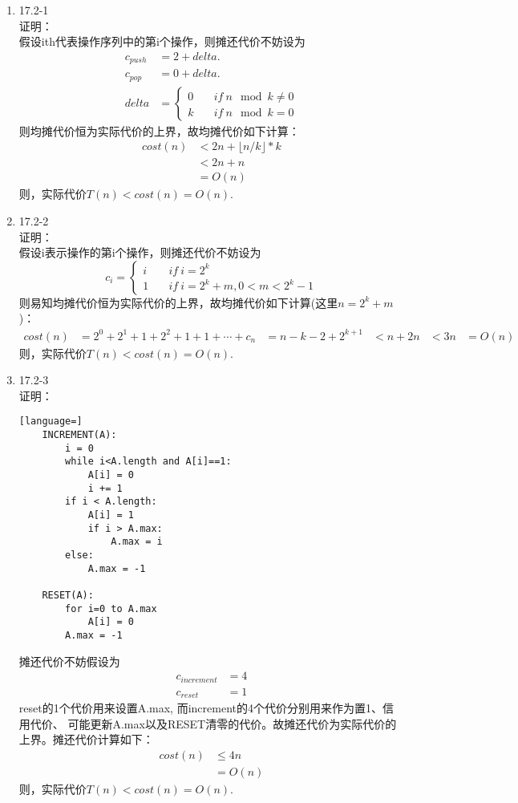 \documentclass[UTF8]{ctexart}
\begin{document}
\begin{enumerate}
	\item 17.2-1 \\
	证明：\\
	假设ith代表操作序列中的第i个操作，则摊还代价不妨设为
	\[
		\begin{aligned}
		c_{push} &= 2 + delta.	\\
		c_{pop} &= 0 + delta.	\\
		delta &= \left\{
		\begin{aligned}
			0 &\quad if\ n\mod k\neq0	\\
			k &\quad if\ n\mod k=0
		\end{aligned}
		\right.
		\end{aligned}
	\]
	则均摊代价恒为实际代价的上界，故均摊代价如下计算：
	\begin{align*}
		cost(n) &< 2n + \lfloor n/k \rfloor *k	\\
			&< 2n + n	\\
			&= O(n)
	\end{align*}
	则，实际代价$T(n) < cost(n) = O(n)$.
	
	\item 17.2-2 \\
	证明：\\
	假设i表示操作的第i个操作，则摊还代价不妨设为
	\[
		c_i = \left\{
		\begin{aligned}
			i	&\quad if \ i = 2^k	\\
			1	&\quad if \	i = 2^k+m, 0<m<2^k-1
		\end{aligned}
		\right.
	\]
	则易知均摊代价恒为实际代价的上界，故均摊代价如下计算(这里$n = 2^k+m$)：
	\begin{align*}
		cost(n) &= 2^0 + 2^1 + 1 + 2^2 + 1 + 1 + \cdots + c_n
				&= n - k - 2 + 2^{k+1}
				&< n + 2n
				&< 3n
				&= O(n)
	\end{align*}
	则，实际代价$T(n) < cost(n) = O(n)$.
	
	\item 17.2-3 \\
	证明：\\
	\begin{lstlisting}[language=]
	INCREMENT(A):
		i = 0
		while i<A.length and A[i]==1:
			A[i] = 0
			i += 1
		if i < A.length:
			A[i] = 1
			if i > A.max:
				A.max = i
		else:
			A.max = -1
			
	RESET(A):
		for i=0 to A.max
			A[i] = 0
		A.max = -1
	\end{lstlisting}
	摊还代价不妨假设为
	\begin{align*}
		c_{increment} &= 4	\\
		c_{reset} &= 1
	\end{align*}
	reset的1个代价用来设置A.max, 而increment的4个代价分别用来作为置1、信用代价、
	可能更新A.max以及RESET清零的代价。故摊还代价为实际代价的上界。摊还代价计算如下：
	\begin{align*}
		cost(n) &\le 4n	\\
				&= O(n)
	\end{align*}
	则，实际代价$T(n) < cost(n) = O(n)$.
	

\end{enumerate}
\end{document}
